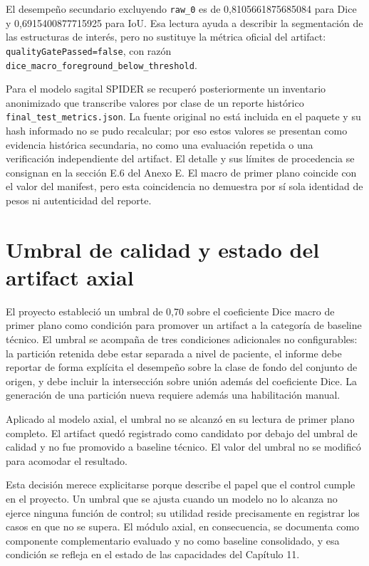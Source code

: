 El desempeño secundario excluyendo \texttt{raw\_0} es de 0,8105661875685084 para Dice y 0,6915400877715925 para IoU. Esa lectura ayuda a describir la segmentación de las estructuras de interés, pero no sustituye la métrica oficial del artifact: \texttt{qualityGatePassed=false}, con razón \texttt{dice\_macro\_foreground\_below\_threshold}.

Para el modelo sagital SPIDER se recuperó posteriormente un inventario anonimizado que transcribe valores por clase de un reporte histórico \texttt{final\_test\_metrics.json}. La fuente original no está incluida en el paquete y su hash informado no se pudo recalcular; por eso estos valores se presentan como evidencia histórica secundaria, no como una evaluación repetida o una verificación independiente del artifact. El detalle y sus límites de procedencia se consignan en la sección E.6 del Anexo E. El macro de primer plano coincide con el valor del manifest, pero esta coincidencia no demuestra por sí sola identidad de pesos ni autenticidad del reporte.

\section{Umbral de calidad y estado del artifact axial}

El proyecto estableció un umbral de 0,70 sobre el coeficiente Dice macro de primer plano como condición para promover un artifact a la categoría de baseline técnico. El umbral se acompaña de tres condiciones adicionales no configurables: la partición retenida debe estar separada a nivel de paciente, el informe debe reportar de forma explícita el desempeño sobre la clase de fondo del conjunto de origen, y debe incluir la intersección sobre unión además del coeficiente Dice. La generación de una partición nueva requiere además una habilitación manual.

Aplicado al modelo axial, el umbral no se alcanzó en su lectura de primer plano completo. El artifact quedó registrado como candidato por debajo del umbral de calidad y no fue promovido a baseline técnico. El valor del umbral no se modificó para acomodar el resultado.

Esta decisión merece explicitarse porque describe el papel que el control cumple en el proyecto. Un umbral que se ajusta cuando un modelo no lo alcanza no ejerce ninguna función de control; su utilidad reside precisamente en registrar los casos en que no se supera. El módulo axial, en consecuencia, se documenta como componente complementario evaluado y no como baseline consolidado, y esa condición se refleja en el estado de las capacidades del Capítulo 11.

